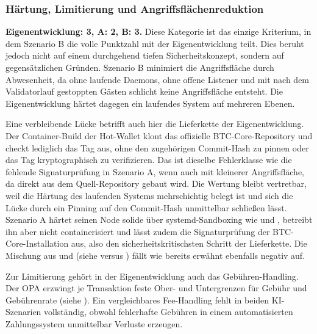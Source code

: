 \subsubsection{Härtung, Limitierung und Angriffsflächenreduktion}
\textbf{Eigenentwicklung: 3, A: 2, B: 3.} Diese Kategorie ist das einzige Kriterium, in dem Szenario B die volle Punktzahl mit der Eigenentwicklung teilt. Dies beruht jedoch nicht auf einem durchgehend tiefen Sicherheitskonzept, sondern auf gegensätzlichen Gründen. Szenario B minimiert die Angriffsfläche durch Abwesenheit, da ohne laufende Daemons, ohne offene Listener und mit nach dem Validatorlauf gestoppten Gästen schlicht keine Angriffsfläche entsteht.
Die Eigenentwicklung härtet dagegen ein laufendes System auf mehreren Ebenen.

Eine verbleibende Lücke betrifft auch hier die Lieferkette der Eigenentwicklung. Der Container-Build der Hot-Wallet klont das offizielle \ac{BTC}-Core-Repository und checkt lediglich das Tag  aus, ohne den zugehörigen Commit-Hash zu pinnen oder das Tag kryptographisch zu verifizieren. Das ist dieselbe Fehlerklasse wie die fehlende Signaturprüfung in Szenario A, wenn auch mit kleinerer Angriffsfläche, da direkt aus dem Quell-Repository gebaut wird. 
Die Wertung bleibt vertretbar, weil die Härtung des laufenden Systems mehrschichtig belegt ist und sich die Lücke durch ein Pinning auf den Commit-Hash unmittelbar schließen lässt.
Szenario A härtet seinen Node solide über systemd-Sandboxing wie  und , betreibt ihn aber nicht containerisiert und lässt zudem die Signaturprüfung der \ac{BTC}-Core-Installation aus, also den sicherheitskritischsten Schritt der Lieferkette. Die Mischung aus  und  (siehe  versus ) fällt wie bereits erwähnt ebenfalls negativ auf.

Zur Limitierung gehört in der Eigenentwicklung auch das Gebühren-Handling. Der \ac{OPA} erzwingt je Transaktion feste Ober- und Untergrenzen für Gebühr und Gebührenrate (siehe ).
Ein vergleichbares Fee-Handling fehlt in beiden \ac{KI}-Szenarien vollständig, obwohl fehlerhafte Gebühren in einem automatisierten Zahlungssystem unmittelbar Verluste erzeugen.

